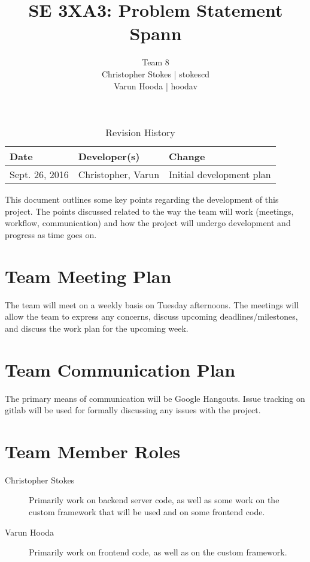 \documentclass{article}
\title{SE 3XA3: Problem Statement\\Spann}
\author{Team 8
		\\ Christopher Stokes | stokescd
		\\ Varun Hooda | hoodav
}
\date{}
\begin{document}
\begin{table}[hp]
\caption{Revision History} \label{TblRevisionHistory}
\begin{tabularx}{\textwidth}{llX}
\toprule
\textbf{Date} & \textbf{Developer(s)} & \textbf{Change}\\
\midrule
    Sept. 26, 2016 & Christopher, Varun & Initial development plan\\
\bottomrule
\end{tabularx}
\end{table}

\newpage

\maketitle

This document outlines some key points regarding the development of this
project. The points discussed related to the way the team will work (meetings, workflow, communication) and how the project will undergo development and progress as time goes on.

\section{Team Meeting Plan}
The team will meet on a weekly basis on Tuesday afternoons. The meetings will
allow the team to express any concerns, discuss upcoming deadlines/milestones,
and discuss the work plan for the upcoming week.

\section{Team Communication Plan}
The primary means of communication will be Google Hangouts. Issue tracking on
gitlab will be used for formally discussing any issues with the project.

\section{Team Member Roles}
\begin{description}
  \item[Christopher Stokes] Primarily work on backend server code, as well as
    some work on the custom framework that will be used and on some frontend
    code.
  \item[Varun Hooda] Primarily work on frontend code, as well as on the custom
    framework.
\end{description}
\end{document}
